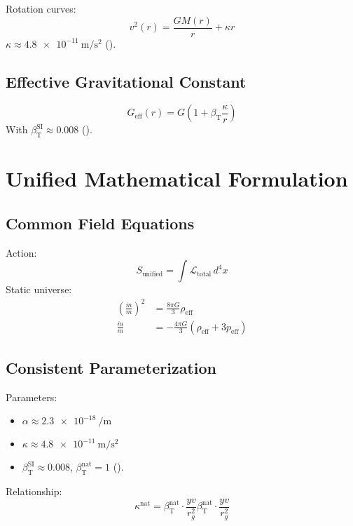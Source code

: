 \documentclass[a4paper,12pt]{article}
\theoremstyle{definition}
\theoremstyle{remark}
\newcommand{\betaT}{\beta_{\text{T}}}
\begin{document}
	Rotation curves:
	\begin{equation}
		v^2(r) = \frac{G M(r)}{r} + \kappa r
	\end{equation}
	\(\kappa \approx \SI{4.8e-11}{\meter\per\second\squared}\) (\cite{pascher_galaxies_2025}).
	
	\subsection{Effective Gravitational Constant}
	
	\begin{equation}
		G_{\text{eff}}(r) = G \left(1 + \betaT \frac{\kappa}{r}\right)
	\end{equation}
	With \(\betaT^{\text{SI}} \approx 0.008\) (\cite{pascher_params_2025}).
	
	\section{Unified Mathematical Formulation}
	
	\subsection{Common Field Equations}
	
	Action:
	\begin{equation}
		S_\text{unified} = \int \mathcal{L}_\text{total} \, d^4x
	\end{equation}
	Static universe:
	\begin{align}
		\left(\frac{\dot{m}}{m}\right)^2 &= \frac{8\pi G}{3} \rho_{\text{eff}} \\
		\frac{\ddot{m}}{m} &= -\frac{4\pi G}{3} (\rho_{\text{eff}} + 3p_{\text{eff}})
	\end{align}
	
	\subsection{Consistent Parameterization}
	
	Parameters:
	\begin{itemize}
		\item \(\alpha \approx \SI{2.3e-18}{\per\meter}\)
		\item \(\kappa \approx \SI{4.8e-11}{\meter\per\second\squared}\)
		\item \(\betaT^{\text{SI}} \approx 0.008\), \(\betaT^{\text{nat}} = 1\) (\cite{pascher_params_2025}).
	\end{itemize}
	Relationship:
	\begin{equation}
		\kappa^{\text{nat}} = \betaT^{\text{nat}} \cdot \frac{yv}{r_g^2}\betaT^{\text{nat}} \cdot \frac{yv}{r_g^2}
	\end{equation}
	
\end{document}
